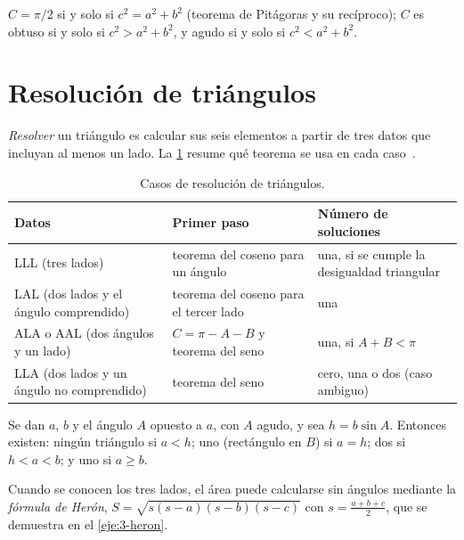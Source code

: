 \begin{corolario}\label{cor:pitagoras}
$C=\pi/2$ si y solo si $c^{2}=a^{2}+b^{2}$ (teorema de Pitágoras y su recíproco); $C$ es obtuso si y solo si $c^{2}>a^{2}+b^{2}$, y agudo si y solo si $c^{2}<a^{2}+b^{2}$.
\end{corolario}

\section{Resolución de triángulos}

\emph{Resolver} un triángulo es calcular sus seis elementos a partir de tres datos que incluyan al menos un lado. La \cref{tab:casos} resume qué teorema se usa en cada caso~\cite[§10.1--10.2]{osat}.

\begin{table}[ht]
\centering\small
\caption{Casos de resolución de triángulos.}\label{tab:casos}
\begin{tabular}{@{}>{\raggedright\arraybackslash}p{4.6cm}>{\raggedright\arraybackslash}p{4.6cm}>{\raggedright\arraybackslash}p{4.6cm}@{}}
\toprule
Datos & Primer paso & Número de soluciones \\
\midrule
LLL (tres lados) & teorema del coseno para un ángulo & una, si se cumple la desigualdad triangular \\
LAL (dos lados y el ángulo comprendido) & teorema del coseno para el tercer lado & una \\
ALA o AAL (dos ángulos y un lado) & $C=\pi-A-B$ y teorema del seno & una, si $A+B<\pi$ \\
LLA (dos lados y un ángulo no comprendido) & teorema del seno & cero, una o dos (caso ambiguo) \\
\bottomrule
\end{tabular}
\end{table}

\begin{proposicion}\label{prop:ambiguo}
Se dan $a$, $b$ y el ángulo $A$ opuesto a $a$, con $A$ agudo, y sea $h=b\sin A$. Entonces existen: ningún triángulo si $a<h$; uno (rectángulo en $B$) si $a=h$; dos si $h<a<b$; y uno si $a\ge b$.
\end{proposicion}

\addtocounter{definicion}{1}%

Cuando se conocen los tres lados, el área puede calcularse sin ángulos mediante la \emph{fórmula de Herón}, $S=\sqrt{s(s-a)(s-b)(s-c)}$ con $s=\frac{a+b+c}{2}$, que se demuestra en el \cref{eje:3-heron}.


